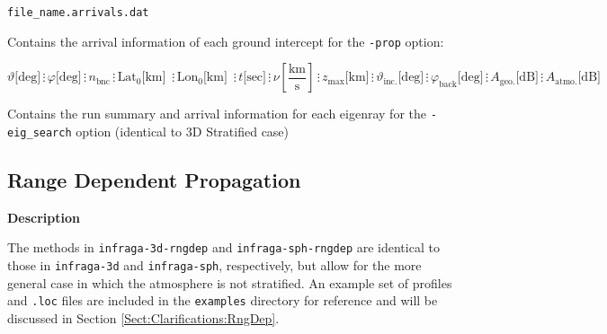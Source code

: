 \documentclass[10pt]{article}
\begin{document}
	\verb=file_name.arrivals.dat=
	
	Contains the arrival information of each ground intercept for the \verb=-prop= option:
	\begin{small}
	\begin{equation*}
	\vartheta \text{[deg]} \hspace{2pt} \vdots \hspace{2pt} 
	\varphi \text{[deg]} \hspace{2pt} \vdots \hspace{2pt} 
	n_\text{bnc} \hspace{2pt} \vdots \hspace{2pt}
	\text{Lat}_0 \text{[km] } \hspace{2pt} \vdots \hspace{2pt}  
	\text{Lon}_0 \text{[km] } \hspace{2pt} \vdots \hspace{2pt}  
	t \text{[sec]} \hspace{2pt} \vdots \hspace{2pt} 
	\nu \left[ \frac{\text{km}}{\text{s}}\right] \hspace{2pt} \vdots \hspace{2pt}
	z_\text{max} \text{[km]} \hspace{2pt} \vdots \hspace{2pt} 
	\vartheta_\text{inc.} \text{[deg]} \hspace{2pt} \vdots \hspace{2pt}
	\varphi_\text{back} \text{[deg]} \hspace{2pt} \vdots \hspace{2pt}
	A_\text{geo.} \text{[dB]} \hspace{2pt} \vdots \hspace{2pt}
	A_\text{atmo.} \text{[dB]}	
	\end{equation*}
	\end{small}

	 Contains the run summary and arrival information for each eigenray for the \verb=-eig_search= option (identical to 3D Stratified case)

\subsection{Range Dependent Propagation}
\label{Sect:Usage:RngDep}
\textbf{Description}  

The methods in \verb=infraga-3d-rngdep= and \verb=infraga-sph-rngdep= are identical to those in \verb=infraga-3d= and \verb=infraga-sph=, respectively, but allow for the more general case in which the atmosphere is not stratified.   An example set of profiles and \verb=.loc= files are included in the \verb=examples= directory for reference and will be discussed in Section \ref{Sect:Clarifications:RngDep}.
\end{document}
